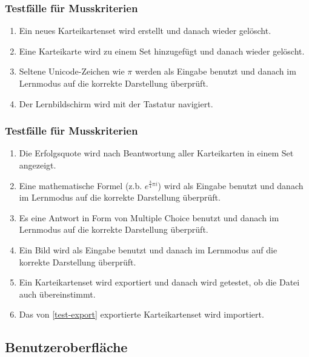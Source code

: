\subsubsection{Testfälle für Musskriterien}
\begin{enumerate}[leftmargin=2cm, label=\bfseries /TM\arabic*0/]
	\item Ein neues Karteikartenset wird erstellt und danach wieder gelöscht.
	\item Eine Karteikarte wird zu einem Set hinzugefügt und danach wieder gelöscht.
	\item Seltene Unicode-Zeichen wie \(\pi\) werden als Eingabe benutzt und danach im Lernmodus auf die korrekte Darstellung überprüft.
	\item Der Lernbildschirm wird mit der Tastatur navigiert.
\end{enumerate}

\subsubsection{Testfälle für Musskriterien}
\begin{enumerate}[leftmargin=2cm, label=\bfseries /TW\arabic*0/]
	\item Die Erfolgsquote wird nach Beantwortung aller Karteikarten in einem Set angezeigt.
	\item Eine mathematische Formel (z.b. \( e^{\frac{3}{4}\pi i}\)) wird als Eingabe benutzt und danach im Lernmodus auf die korrekte Darstellung überprüft.
	\item Es eine Antwort in Form von Multiple Choice benutzt und danach im Lernmodus auf die korrekte Darstellung überprüft.
	\item Ein Bild wird als Eingabe benutzt und danach im Lernmodus auf die korrekte Darstellung überprüft.
	\item\label{test-export} Ein Karteikartenset wird exportiert und danach wird getestet, ob die Datei auch übereinstimmt.
	\item Das von \ref{test-export} exportierte Karteikartenset wird importiert.
\end{enumerate}


\subsection{Benutzeroberfläche}
